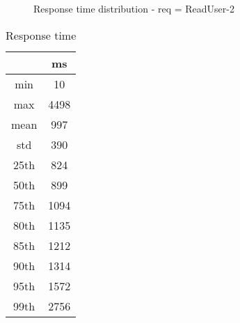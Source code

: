 \begin{minipage}{0.75\linewidth}
\begin{figure}[h]
\begin{adjustbox}{max width=1.0\linewidth, keepaspectratio}
  \end{adjustbox}
  \caption{Response time distribution - req = ReadUser-2}
\end{figure}
\end{minipage}\hfill\begin{minipage}{0.18\linewidth}
\begin{table}[h]
\begin{tabular}{|cc|}
\hline
\textbf{} & \textbf{ms}\\ \hline
 \Xhline{0.005\arrayrulewidth}
min & 10\\
 \Xhline{0.005\arrayrulewidth}
max & 4498\\
 \Xhline{0.005\arrayrulewidth}
mean & 997\\
 \Xhline{0.005\arrayrulewidth}
std & 390\\
\hline
\hline
 \Xhline{0.005\arrayrulewidth}
25th & 824\\
 \Xhline{0.005\arrayrulewidth}
50th & 899\\
 \Xhline{0.005\arrayrulewidth}
75th & 1094\\
 \Xhline{0.005\arrayrulewidth}
80th & 1135\\
 \Xhline{0.005\arrayrulewidth}
85th & 1212\\
 \Xhline{0.005\arrayrulewidth}
90th & 1314\\
 \Xhline{0.005\arrayrulewidth}
95th & 1572\\
 \Xhline{0.005\arrayrulewidth}
99th & 2756\\
\hline
\end{tabular}
\caption{Response time}
\end{table}
\end{minipage}\hfill